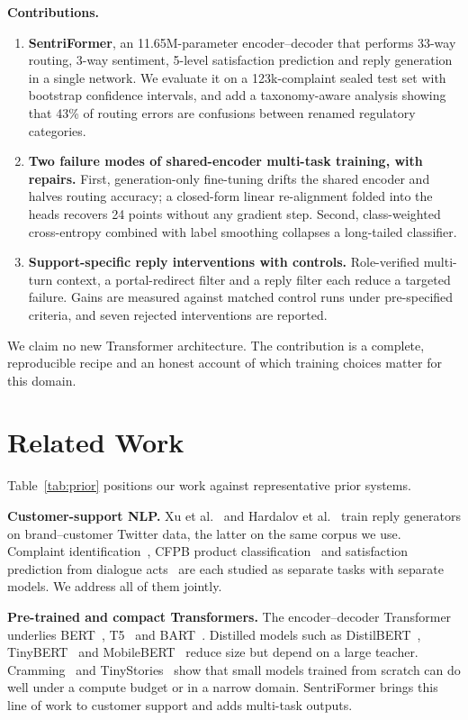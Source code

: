 \documentclass[conference]{IEEEtran}
\begin{document}
\textbf{Contributions.}
\begin{enumerate}
\item \textbf{SentriFormer}, an 11.65M-parameter encoder--decoder that performs 33-way routing, 3-way sentiment, 5-level satisfaction prediction and reply generation in a single network. We evaluate it on a 123k-complaint sealed test set with bootstrap confidence intervals, and add a taxonomy-aware analysis showing that 43\% of routing errors are confusions between renamed regulatory categories.
\item \textbf{Two failure modes of shared-encoder multi-task training, with repairs.} First, generation-only fine-tuning drifts the shared encoder and halves routing accuracy; a closed-form linear re-alignment folded into the heads recovers 24 points without any gradient step. Second, class-weighted cross-entropy combined with label smoothing collapses a long-tailed classifier.
\item \textbf{Support-specific reply interventions with controls.} Role-verified multi-turn context, a portal-redirect filter and a reply filter each reduce a targeted failure. Gains are measured against matched control runs under pre-specified criteria, and seven rejected interventions are reported.
\end{enumerate}
We claim no new Transformer architecture. The contribution is a complete, reproducible recipe and an honest account of which training choices matter for this domain.

\section{Related Work}
Table~\ref{tab:prior} positions our work against representative prior systems.

\textbf{Customer-support NLP.} Xu et al.~\cite{xu2017new} and Hardalov et al.~\cite{hardalov2018towards} train reply generators on brand--customer Twitter data, the latter on the same corpus we use. Complaint identification~\cite{preotiucpietro2019automatically,jin2020complaint}, CFPB product classification~\cite{oyewola2023consumer} and satisfaction prediction from dialogue acts~\cite{oraby2017how} are each studied as separate tasks with separate models. We address all of them jointly.

\textbf{Pre-trained and compact Transformers.} The encoder--decoder Transformer~\cite{vaswani2017attention,sutskever2014sequence} underlies BERT~\cite{devlin2019bert}, T5~\cite{raffel2020exploring} and BART~\cite{lewis2020bart}. Distilled models such as DistilBERT~\cite{sanh2019distilbert}, TinyBERT~\cite{jiao2020tinybert} and MobileBERT~\cite{sun2020mobilebert} reduce size but depend on a large teacher. Cramming~\cite{geiping2023cramming} and TinyStories~\cite{eldan2023tinystories} show that small models trained from scratch can do well under a compute budget or in a narrow domain. SentriFormer brings this line of work to customer support and adds multi-task outputs.
\end{document}
